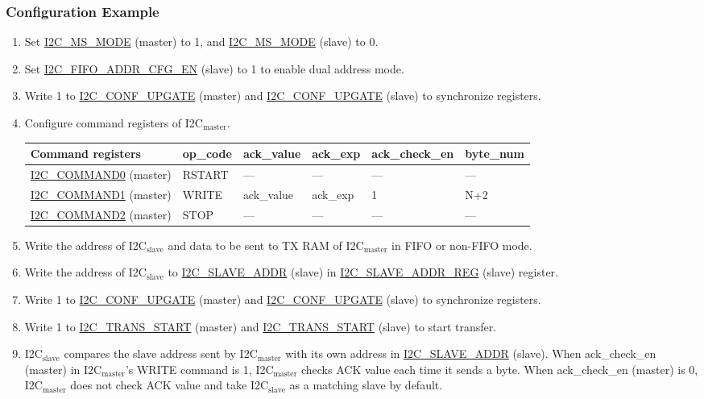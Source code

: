 \documentclass[main\_\_EN.tex]{subfiles}
\begin{document}
\subsubsection{Configuration Example}

\begin{enumerate}
\item Set \hyperref[fielddesc:I2CMSMODE]{I2C\_MS\_MODE} (master) to 1, and \hyperref[fielddesc:I2CMSMODE]{I2C\_MS\_MODE} (slave) to 0.
\item Set \hyperref[fielddesc:I2CFIFOADDRCFGEN]{I2C\_FIFO\_ADDR\_CFG\_EN} (slave) to 1 to enable dual address mode.
\item Write 1 to \hyperref[fielddesc:I2CCONFUPGATE]{I2C\_CONF\_UPGATE} (master) and \hyperref[fielddesc:I2CCONFUPGATE]{I2C\_CONF\_UPGATE} (slave) to synchronize registers.
\item Configure command registers of I2C$_\text{master}$.
\begin{longtable}{  | p{5cm} | p{1.5cm} | p{1.5cm} | p{1.5cm} |p{2.5cm} | p{1.5cm} |}
\hline\rowcolor{lightgray}
Command registers& op\_code & ack\_value&ack\_exp&ack\_check\_en&byte\_num  \\ \hline
\hyperref[fielddesc:I2CCOMMAND0]{I2C\_COMMAND0} (master)& RSTART& ---&---&---&---  \\ \hline
\hyperref[fielddesc:I2CCOMMAND1]{I2C\_COMMAND1} (master)& WRITE& ack\_value&ack\_exp&1&N+2  \\ \hline
\hyperref[fielddesc:I2CCOMMAND2]{I2C\_COMMAND2} (master)& STOP& ---&---&---&---  \\ \hline
\end{longtable}
\item Write the address of I2C$_\text{slave}$ and data to be sent to TX RAM of I2C$_\text{master}$ in FIFO or non-FIFO mode.
\item Write the address of I2C$_\text{slave}$ to \hyperref[fielddesc:I2CSLAVEADDR]{I2C\_SLAVE\_ADDR} (slave) in \hyperref[regdesc:I2CSLAVEADDRREG]{I2C\_SLAVE\_ADDR\_REG} (slave) register.
\item Write 1 to \hyperref[fielddesc:I2CCONFUPGATE]{I2C\_CONF\_UPGATE} (master) and \hyperref[fielddesc:I2CCONFUPGATE]{I2C\_CONF\_UPGATE} (slave) to synchronize registers.
\item Write 1 to \hyperref[fielddesc:I2CTRANSSTART]{I2C\_TRANS\_START} (master) and \hyperref[fielddesc:I2CTRANSSTART]{I2C\_TRANS\_START} (slave) to start transfer.
\item I2C$_\text{slave}$ compares the slave address sent by I2C$_\text{master}$ with its own address in \hyperref[fielddesc:I2CSLAVEADDR]{I2C\_SLAVE\_ADDR} (slave). When ack\_check\_en (master) in I2C$_\text{master}$'s WRITE command is 1, I2C$_\text{master}$ checks ACK value each time it sends a byte. When ack\_check\_en (master) is 0, I2C$_\text{master}$ does not check ACK value and take I2C$_\text{slave}$ as a matching slave by default.

\end{enumerate}
\end{document}

